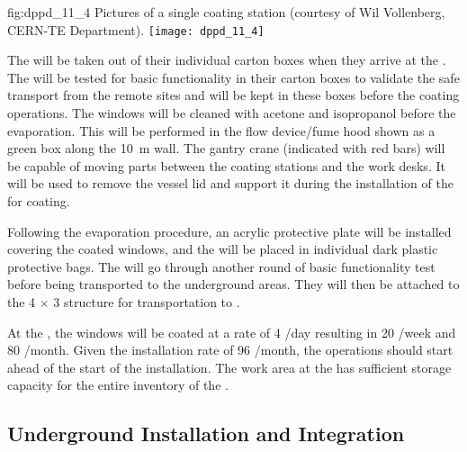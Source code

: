 \begin{dunefigure}{fig:dppd_11_4}
{Pictures of a single  coating station (courtesy of Wil Vollenberg, CERN-TE Department).}
\texttt{[image: dppd\_11\_4]}
\end{dunefigure}

The  will be taken out of their individual carton boxes when they arrive at the . The  will be tested for basic functionality in their carton boxes to validate the safe transport from the remote sites and will be kept in these boxes before the coating operations. The  windows will be cleaned with acetone and isopropanol before the evaporation. This will be performed in the flow device/fume hood shown as a green box along the \SI{10}{\m} wall. The gantry crane (indicated with red bars) will be capable of moving parts between the coating stations and the work desks. It will be used to remove the vessel lid and support it during the installation of the  for coating.

Following the evaporation procedure, an acrylic protective plate will be installed covering the coated  windows, and the  will be placed in individual dark plastic protective bags. The  will go through another round of basic functionality test before being transported to the underground areas. They will then be attached to the \num{4} $\times$ \num{3} structure for transportation to \surf.

At the , the  windows will be coated at a rate of \num{4} /day resulting in \num{20} /week and \num{80} /month. Given the installation rate of \num{96} /month, the  operations should start ahead of the start of the installation. The  work area at the  has sufficient storage capacity for the entire  inventory of the . 

\subsection{Underground Installation and Integration}
\label{subsec:dp-pds-undergroundinstallation}

